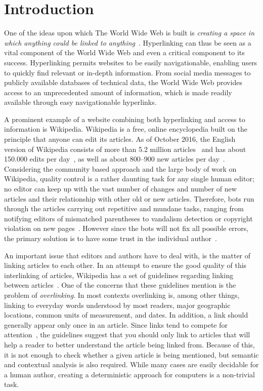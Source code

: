 \chapter{Introduction}\label{ch:introduction}
One of the ideas upon which The World Wide Web is built is \emph{creating a space in which anything could be linked to anything}~\cite[ch.~1, p.~4]{Weaving-the-web}. Hyperlinking can thus be seen as a vital component of the World Wide Web and even a critical component to its success. Hyperlinking permits websites to be easily navigationable, enabling users to quickly find relevant or in-depth information. From social media messages to publicly available databases of technical data, the World Wide Web provides access to an unprecedented amount of information, which is made readily available through easy navigationable hyperlinks.

A prominent example of a website combining both hyperlinking and access to information is Wikipedia. Wikipedia is a free, online encyclopedia built on the principle that anyone can edit its articles. As of October 2016, the English version of Wikipedia consists of more than 5.2 million articles~\cite{wiki-about} and has about 150.000 edits per day~\cite{wiki-num-edits}, as well as about 800--900 new articles per day~\cite{wmcharts}. Considering the community based approach and the large body of work on Wikipedia, quality control is a rather daunting task for any single human editor; no editor can keep up with the vast number of changes and number of new articles and their relationship with other old or new articles. Therefore, bots run through the articles carrying out repetitive and mundane tasks, ranging from notifying editors of mismatched parentheses to vandalism detection or copyright violation on new pages~\cite{wiki-bots}. However since the bots will not fix all possible errors, the primary solution is to have some trust in the individual author~\cite{wiki-editor-guidelines}.

An important issue that editors and authors have to deal with, is the matter of linking articles to each other. In an attempt to ensure the good quality of this interlinking of articles, Wikipedia has a set of guidelines regarding linking between articles~\cite{wiki-manual-of-style-overlinking}. One of the concerns that these guidelines mention is the problem of \emph{overlinking}. In most contexts overlinking is, among other things, linking to everyday words understood by most readers, major geographic locations, common units of measurement, and dates. In addition, a link should generally appear only once in an article. Since links tend to compete for attention~\cite{hyperlink-structure-using-logs}, the guidelines suggest that you should only link to articles that will help a reader to better understand the article being linked from. Because of this, it is not enough to check whether a given article is being mentioned, but semantic and contextual analysis is also required. While many cases are easily decidable for a human author, creating a deterministic approach for computers is a non-trivial task.

